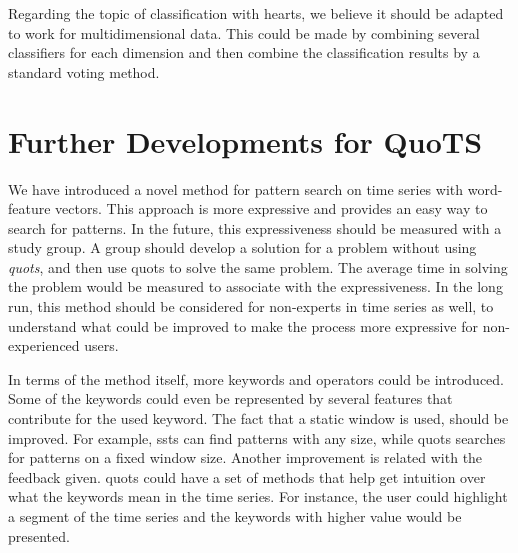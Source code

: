 \par
Regarding the topic of classification with \gls{hearts}, we believe it should be adapted to work for multidimensional data. This could be made by combining several classifiers for each dimension and then combine the classification results by a standard voting method. 



\section{Further Developments for QuoTS}

We have introduced a novel method for pattern search on time series with word-feature vectors. This approach is more expressive and provides an easy way to search for patterns. In the future, this expressiveness should be measured with a study group. A group should develop a solution for a problem without using \textit{quots}, and then use \gls{quots} to solve the same problem. The average time in solving the problem would be measured to associate with the expressiveness.  In the long run, this method should be considered for non-experts in time series as well, to understand what could be improved to make the process more expressive for non-experienced users.
\par
In terms of the method itself, more keywords and operators could be introduced. Some of the keywords could even be represented by several features that contribute for the used keyword. The fact that a static window is used, should be improved. For example, \gls{ssts} can find patterns with any size, while \gls{quots} searches for patterns on a fixed window size. Another improvement is related with the feedback given. \gls{quots} could have a set of methods that help get intuition over what the keywords mean in the time series. For instance, the user could highlight a segment of the time series and the keywords with higher value would be presented.